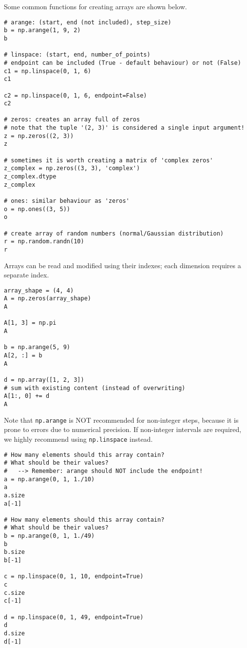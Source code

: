 Some common functions for creating arrays are shown below.

\begin{lstlisting}[frame=single]
# arange: (start, end (not included), step_size)
b = np.arange(1, 9, 2) 
b

# linspace: (start, end, number_of_points)
# endpoint can be included (True - default behaviour) or not (False)
c1 = np.linspace(0, 1, 6)
c1

c2 = np.linspace(0, 1, 6, endpoint=False)
c2

# zeros: creates an array full of zeros
# note that the tuple '(2, 3)' is considered a single input argument!
z = np.zeros((2, 3))
z

# sometimes it is worth creating a matrix of 'complex zeros'
z_complex = np.zeros((3, 3), 'complex')
z_complex.dtype
z_complex

# ones: similar behaviour as 'zeros'
o = np.ones((3, 5))
o

# create array of random numbers (normal/Gaussian distribution)
r = np.random.randn(10)
r
\end{lstlisting}

Arrays can be read and modified using their indexes; each dimension requires a separate index.

\begin{lstlisting}[frame=single]
array_shape = (4, 4)
A = np.zeros(array_shape)
A

A[1, 3] = np.pi
A

b = np.arange(5, 9)
A[2, :] = b
A

d = np.array([1, 2, 3])
# sum with existing content (instead of overwriting)
A[1:, 0] += d
A
\end{lstlisting}


Note that {\tt np.arange} is NOT recommended for non-integer steps, because it is prone to errors due to numerical precision. If non-integer intervals are required, we highly recommend using {\tt np.linspace} instead.

\begin{lstlisting}[frame=single]
# How many elements should this array contain?
# What should be their values?
#   --> Remember: arange should NOT include the endpoint!
a = np.arange(0, 1, 1./10)
a
a.size
a[-1]

# How many elements should this array contain?
# What should be their values?
b = np.arange(0, 1, 1./49)
b
b.size
b[-1]

c = np.linspace(0, 1, 10, endpoint=True)
c
c.size
c[-1]

d = np.linspace(0, 1, 49, endpoint=True)
d
d.size
d[-1]
\end{lstlisting}

